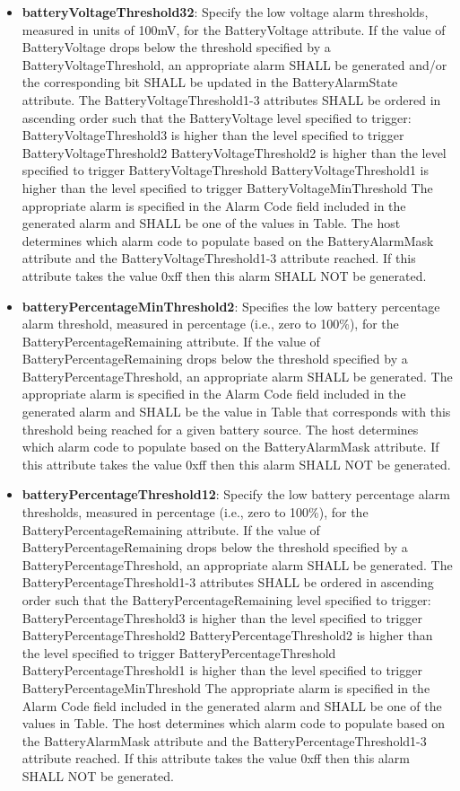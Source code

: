 \begin{itemize}
\item \textbf{batteryVoltageThreshold32}: Specify the low voltage alarm thresholds, measured in units of 100mV, for the BatteryVoltage attribute. If the value of BatteryVoltage drops below the threshold specified by a BatteryVoltageThreshold, an appropriate alarm SHALL be generated and/or the corresponding bit SHALL be updated in the BatteryAlarmState attribute. The BatteryVoltageThreshold1-3 attributes SHALL be ordered in ascending order such that the BatteryVoltage level specified to trigger: BatteryVoltageThreshold3 is higher than the level specified to trigger BatteryVoltageThreshold2 BatteryVoltageThreshold2 is higher than the level specified to trigger BatteryVoltageThreshold BatteryVoltageThreshold1 is higher than the level specified to trigger BatteryVoltageMinThreshold The appropriate alarm is specified in the Alarm Code field included in the generated alarm and SHALL be one of the values in Table. The host determines which alarm code to populate based on the BatteryAlarmMask attribute and the BatteryVoltageThreshold1-3 attribute reached. If this attribute takes the value 0xff then this alarm SHALL NOT be generated.
\item \textbf{batteryPercentageMinThreshold2}: Specifies the low battery percentage alarm threshold, measured in percentage (i.e., zero to 100\%), for the BatteryPercentageRemaining attribute. If the value of BatteryPercentageRemaining drops below the threshold specified by a BatteryPercentageThreshold, an appropriate alarm SHALL be generated. The appropriate alarm is specified in the Alarm Code field included in the generated alarm and SHALL be the value in Table that corresponds with this threshold being reached for a given battery source. The host determines which alarm code to populate based on the BatteryAlarmMask attribute. If this attribute takes the value 0xff then this alarm SHALL NOT be generated.
\item \textbf{batteryPercentageThreshold12}: Specify the low battery percentage alarm thresholds, measured in percentage (i.e., zero to 100\%), for the BatteryPercentageRemaining attribute. If the value of BatteryPercentageRemaining drops below the threshold specified by a BatteryPercentageThreshold, an appropriate alarm SHALL be generated. The BatteryPercentageThreshold1-3 attributes SHALL be ordered in ascending order such that the BatteryPercentageRemaining level specified to trigger: BatteryPercentageThreshold3 is higher than the level specified to trigger BatteryPercentageThreshold2 BatteryPercentageThreshold2 is higher than the level specified to trigger BatteryPercentageThreshold BatteryPercentageThreshold1 is higher than the level specified to trigger BatteryPercentageMinThreshold The appropriate alarm is specified in the Alarm Code field included in the generated alarm and SHALL be one of the values in Table. The host determines which alarm code to populate based on the BatteryAlarmMask attribute and the BatteryPercentageThreshold1-3 attribute reached. If this attribute takes the value 0xff then this alarm SHALL NOT be generated.

\end{itemize}

